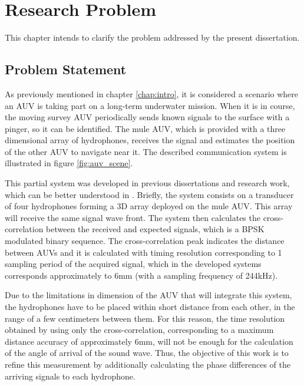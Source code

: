 \chapter{Research Problem} \label{chap:problem}

This chapter intends to clarify the problem addressed by the present dissertation. 

\section{Problem Statement}

As previously mentioned in chapter \ref{chap:intro}, it is considered a scenario where an AUV is taking part on a long-term underwater mission. When it is in course, the moving survey AUV periodically sends known signals to the surface with a pinger, so it can be identified. The mule AUV, which is provided with a three dimensional array of hydrophones, receives the signal and estimates the position of the other AUV to navigate near it. The described communication system is illustrated in figure \ref{fig:auv_scene}. 


This partial system was developed in previous dissertations and research work, which can be better understood in \cite{afonso-thesis}. Briefly, the system consists on a transducer of four hydrophones forming a 3D array deployed on the mule AUV. This array will receive the same signal wave front. The system then calculates the cross-correlation between the received and expected signals, which is a BPSK modulated binary sequence. The cross-correlation peak indicates the distance between AUVs and it is calculated with timing resolution corresponding to 1 sampling period of the acquired signal, which in the developed systems corresponds approximately to 6mm (with a sampling frequency of 244kHz).


Due to the limitations in dimension of the AUV that will integrate this system, the hydrophones have to be placed within short distance from each other, in the range of a few centimeters between them. For this reason, the time resolution obtained by using only the cross-correlation, corresponding to a maximum distance accuracy of approximately 6mm, will not be enough for the calculation of the angle of arrival of the sound wave. Thus, the objective of this work is to refine this measurement by additionally calculating the phase differences of the arriving signals to each hydrophone. 



